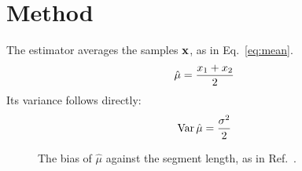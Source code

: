 \section{Method}\label{sec:method}
The estimator averages the samples $\mathbf{x}$, as in Eq.~\eqref{eq:mean}.
\begin{equation}
  \hat{\mu} = \frac{x_1 + x_2}{2}
  \label{eq:mean}
\end{equation}
Its variance follows directly:
\[
  \operatorname{Var}\hat{\mu} = \frac{\sigma^2}{2}
\]
\begin{figure}
  \centering
  \caption{The bias of $\hat{\mu}$ against the segment length, as in Ref.~\cite{fisher1925}.}
  \label{fig:bias}
\end{figure}
